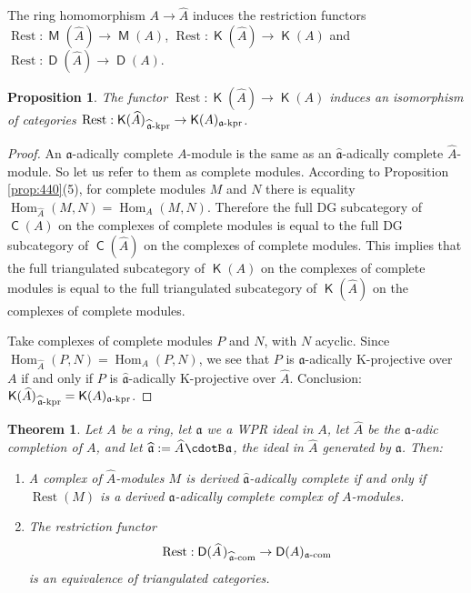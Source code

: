 \documentclass[10pt]{amsart}
\newtheorem{thm}[equation]{Theorem}
\newtheorem{prop}[equation]{Proposition}
\theoremstyle{definition}
\numberwithin{equation}{section}
\newcommand{\opn}{\operatorname}
\newcommand{\cat}[1]{\operatorname{\mathsf{#1}}}
\newcommand{\cd}{\mspace{1.3mu}{\cdotB}\mspace{1.3mu}}
\newcommand{\mfrak}[1]{\mathfrak{#1}}
\renewcommand{\a}{\mfrak{a}}
\newcommand{\tup}[1]{\textrm{#1}}
\newcommand{\what}[1]{\widehat{#1}}
\newcommand{\msp}[1]{\mspace{#1 mu}}
\begin{document}
The ring homomorphism $A \to \what{A}$ induces the restriction functors
$\opn{Rest} : \cat{M}(\what{A}) \to \cat{M}(A)$,
$\opn{Rest} : \cat{K}(\what{A}) \to \cat{K}(A)$ and
$\opn{Rest} : \cat{D}(\what{A}) \to \cat{D}(A)$.

\begin{prop} \label{prop:453}
The functor
$\opn{Rest} : \cat{K}(\what{A}) \to \cat{K}(A)$
induces an isomorphism of categories
$\opn{Rest} : \cat{K}(\what{A})_{\msp{2} \tup{$\what{\a}$-kpr}} \to
\cat{K}(A)_{\tup{$\a$-kpr}}$.
\end{prop}

\begin{proof}
An $\a$-adically complete $A$-module is the same as an
$\what{\a}$-adically complete $\what{A}$-module.
So let us refer to them as complete modules.
According to Proposition \ref{prop:440}(5), for complete modules $M$ and $N$
there is equality
$\opn{Hom}_{\what{A}}(M, N) = \opn{Hom}_{A}(M, N)$.
Therefore the full DG subcategory of $\cat{C}(A)$ on the
complexes of complete modules is equal to the full DG subcategory of
$\cat{C}(\what{A})$ on the complexes of complete modules.
This implies that the full triangulated subcategory of $\cat{K}(A)$ on the
complexes of complete modules is equal to the full triangulated subcategory
of $\cat{K}(\what{A})$ on the complexes of complete modules.

Take complexes of complete modules $P$ and $N$, with $N$ acyclic.
Since
$\opn{Hom}_{\what{A}}(P, N) = \opn{Hom}_{A}(P, N)$,
we see that $P$ is $\a$-adically K-projective over $A$ if and only if
$P$ is $\what{\a}$-adically K-projective over $\what{A}$.
Conclusion:
$\cat{K}(\what{A})_{\msp{2} \tup{$\what{\a}$-kpr}} =
\cat{K}(A)_{\tup{$\a$-kpr}}$.
\end{proof}

\begin{thm} \label{thm:235}
Let $A$ be a ring, let $\a$ we a WPR ideal in $A$,
let $\what{A}$ be the $\a$-adic completion of $A$, and let
$\what{\a} := \what{A} \cd \a$, the ideal in $\what{A}$ generated by $\a$. Then:
\begin{enumerate}
\item A complex of $\what{A}$-modules $M$ is derived $\what{\a}$-adically
complete if and only if $\opn{Rest}(M)$ is a derived $\a$-adically
complete complex of $A$-modules.

\item The restriction functor
\[ \opn{Rest} : \cat{D}(\what{A} \msp{2})_{\msp{2} \tup{$\what{\a}$-com}} \to
\cat{D}(A)_{\tup{$\a$-com}} \]
is an equivalence of triangulated categories.
\end{enumerate}
\end{thm}
\end{document}
